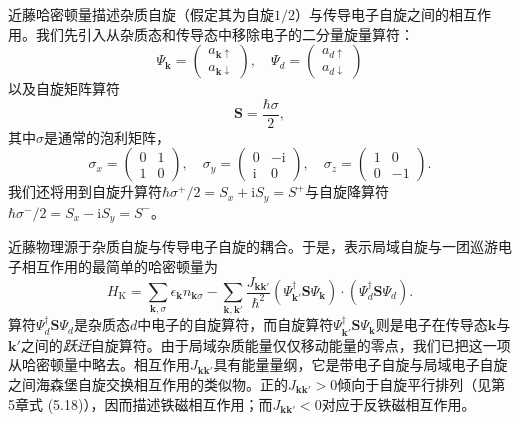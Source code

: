 近藤哈密顿量描述杂质自旋（假定其为自旋$1/2$）与传导电子自旋之间的相互作用。我们先引入从杂质态和传导态中移除电子的二分量旋量算符：
\begin{equation*}
\Psi_{\mathbf{k}} = \begin{pmatrix} a_{\mathbf{k}\uparrow} \\ a_{\mathbf{k}\downarrow} \end{pmatrix}, \quad \Psi_d = \begin{pmatrix} a_{d\uparrow} \\ a_{d\downarrow} \end{pmatrix}
\tag{8.1}
\end{equation*}
以及自旋矩阵算符
\begin{equation*}
\mathbf{S} = \frac{\hbar\sigma}{2},
\tag{8.2}
\end{equation*}
其中$\sigma$是通常的泡利矩阵，
\begin{equation*}
\sigma_x = \begin{pmatrix} 0 & 1 \\ 1 & 0 \end{pmatrix}, \quad \sigma_y = \begin{pmatrix} 0 & -\mathrm{i} \\ \mathrm{i} & 0 \end{pmatrix}, \quad \sigma_z = \begin{pmatrix} 1 & 0 \\ 0 & -1 \end{pmatrix}.
\tag{8.3}
\end{equation*}
我们还将用到自旋升算符$\hbar\sigma^+/2 = S_x + \mathrm{i}S_y = S^+$与自旋降算符$\hbar\sigma^-/2 = S_x - \mathrm{i}S_y = S^-$。

近藤物理源于杂质自旋与传导电子自旋的耦合。于是，表示局域自旋与一团巡游电子相互作用的最简单的哈密顿量为
\begin{equation*}
H_{\mathrm{K}} = \sum_{\mathbf{k},\sigma}\epsilon_{\mathbf{k}} n_{\mathbf{k}\sigma} - \sum_{\mathbf{k},\mathbf{k}'}\frac{J_{\mathbf{k}\mathbf{k}'}}{\hbar^2}\left(\Psi_{\mathbf{k}'}^{\dagger}\mathbf{S}\Psi_{\mathbf{k}}\right)\cdot\left(\Psi_d^{\dagger}\mathbf{S}\Psi_d\right).
\tag{8.4}
\end{equation*}
算符$\Psi_d^{\dagger}\mathbf{S}\Psi_d$是杂质态$d$中电子的自旋算符，而自旋算符$\Psi_{\mathbf{k}'}^{\dagger}\mathbf{S}\Psi_{\mathbf{k}}$则是电子在传导态$\mathbf{k}$与$\mathbf{k}'$之间的\emph{跃迁}自旋算符。由于局域杂质能量仅仅移动能量的零点，我们已把这一项从哈密顿量中略去。相互作用$J_{\mathbf{k}\mathbf{k}'}$具有能量量纲，它是带电子自旋与局域电子自旋之间海森堡自旋交换相互作用的类似物。正的$J_{\mathbf{k}\mathbf{k}'}>0$倾向于自旋平行排列（见第5章式 (5.18)），因而描述铁磁相互作用；而$J_{\mathbf{k}\mathbf{k}'}<0$对应于反铁磁相互作用。

